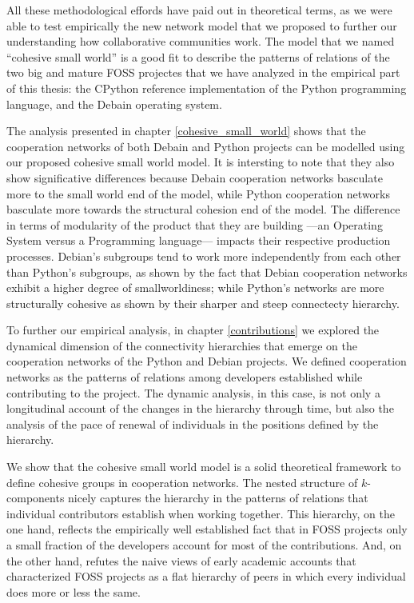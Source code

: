 All these methodological effords have paid out in theoretical terms, as we were able to test empirically the new network model that we proposed to further our understanding how collaborative communities work. The model that we named ``cohesive small world'' is a good fit to describe the patterns of relations of the two big and mature FOSS projectes that we have analyzed in the empirical part of this thesis: the CPython reference implementation of the Python programming language, and the Debain operating system.

The analysis presented in chapter \ref{cohesive_small_world} shows that the cooperation networks of both Debain and Python projects can be modelled using our proposed cohesive small world model. It is intersting to note that they also show significative differences because Debain cooperation networks basculate more to the small world end of the model, while Python cooperation networks basculate more towards the structural cohesion end of the model. The difference in terms of modularity of the product that they are building ---an Operating System versus a Programming language--- impacts their respective production processes. Debian's subgroups tend to work more independently from each other than Python's subgroups, as shown by the fact that Debian cooperation networks exhibit a higher degree of smallworldiness; while Python's networks are more structurally cohesive as shown by their sharper and steep connectecty hierarchy.

To further our empirical analysis, in chapter \ref{contributions} we explored the dynamical dimension of the connectivity hierarchies that emerge on the cooperation networks of the Python and Debian projects. We defined cooperation networks as the patterns of relations among developers established while contributing to the project. The dynamic analysis, in this case, is not only a longitudinal account of the changes in the hierarchy through time, but also the analysis of the pace of renewal of individuals in the positions defined by the hierarchy.

We show that the cohesive small world model is a solid theoretical framework to define cohesive groups in cooperation networks. The nested structure of $k$-components nicely captures the hierarchy in the patterns of relations that individual contributors establish when working together. This hierarchy, on the one hand, reflects the empirically well established fact that in FOSS projects only a small fraction of the developers account for most of the contributions. And, on the other hand, refutes the naive views of early academic accounts that characterized FOSS projects as a flat hierarchy of peers in which every individual does more or less the same. 

